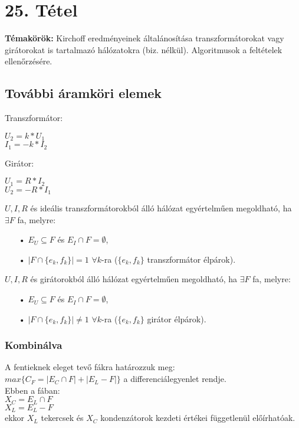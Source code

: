 
\setcounter{chapter}{25}
\chapter*{25. Tétel}

\textbf{Témakörök:} Kirchoff eredményeinek általánosítása transzformátorokat vagy girátorokat is tartalmazó hálózatokra (biz. nélkül). Algoritmusok a feltételek ellenőrzésére.

\noindent\hrulefill

\section*{További áramköri elemek}
Transzformátor:
\begin{center}
$U_{2}=k*U_{1}$\\
$I_{1}=-k*I_{2}$
\end{center}
Girátor:
\begin{center}
$U_{1}=R*I_{2}$\\
$U_{2}=-R*I_{1}$
\end{center}

\begin{theo} [1]
$U,I,R$ és ideális transzformátorokból álló hálózat egyértelműen megoldható, ha $\exists F$ fa, melyre:
\begin{itemize}
\item[•] $E_{U}\subseteq F$ és $E_{I}\cap F=\emptyset$,
\item[•] $|F\cap\lbrace e_{k},f_{k}\rbrace |=1$ $\forall k$-ra ($\lbrace e_{k},f_{k}\rbrace$ transzformátor élpárok).
\end{itemize}
\end{theo}

\begin{theo} [2]
$U,I,R$ és girátorokból álló hálózat egyértelműen megoldható, ha $\exists F$ fa, melyre:
\begin{itemize}
\item[•] $E_{U}\subseteq F$ és $E_{I}\cap F=\emptyset$,
\item[•] $|F\cap\lbrace e_{k},f_{k}\rbrace |\neq 1$ $\forall k$-ra ($\lbrace e_{k},f_{k}\rbrace$ girátor élpárok).
\end{itemize}
\end{theo}

\subsection*{Kombinálva}
A fentieknek eleget tevő fákra határozzuk meg:\\
$max\lbrace C_{F}=|E_{C}\cap F|+|E_{L}-F|\rbrace$ a differenciálegyenlet rendje.\\
\newline
Ebben a fában:\\
$X_{C}=E_{L}\cap F$\\
$X_{L}=E_{L}-F$\\
ekkor $X_{L}$ tekercsek és $X_{C}$ kondenzátorok kezdeti értékei függetlenül előírhatóak.

